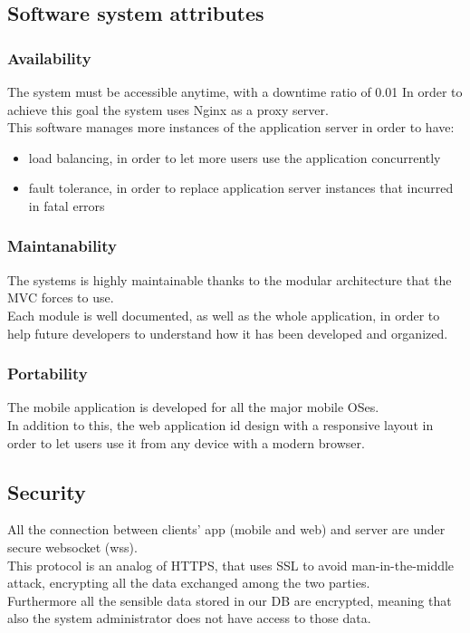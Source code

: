 \subsection{Software system attributes}

\subsubsection{Availability}
The system must be accessible anytime, with a downtime ratio of 0.01 %
In order to achieve this goal the system uses Nginx as a proxy server.\\
This software manages more instances of the application server in order to have:
\begin{itemize}
\item load balancing, in order to let more users use the application concurrently
\item fault tolerance, in order to replace application server instances that incurred in fatal errors
\end{itemize}
\subsubsection{Maintanability}
The systems is highly maintainable thanks to the modular architecture that the MVC forces to use.\\
Each module is well documented, as well as the whole application, in order to help future developers to understand how it has been developed and organized.

\subsubsection{Portability}
The mobile application is developed for all the major mobile OSes.\\
In addition to this, the web application id design with a responsive layout in order to let users use it from any device with a modern browser.

\subsection{Security}
All the connection between clients’ app (mobile and web) and server are under secure websocket (wss).\\
This protocol is an analog of HTTPS, that uses SSL to avoid man-in-the-middle attack, encrypting all the data exchanged among the two parties.\\
Furthermore all the sensible data stored in our DB are encrypted, meaning that also the system administrator does not have access to those data.
